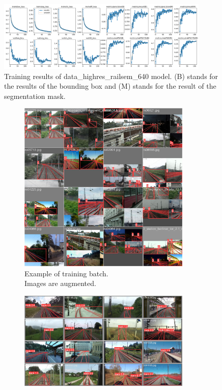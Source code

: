\documentclass[Master,MDS,english]{BASE/twbook} %
\begin{document}
\begin{figure}[h]
\centering
\includegraphics[width=0.9\textwidth]{images/yolo/highres/results}
\caption{Training results of data\_highres\_railsem\_640 model. (B) stands for the results of the bounding box and (M) stands for the result of the segmentation mask.}
\label{fig:training_highres}
\end{figure}

\begin{figure}
\centering
\begin{subfigure}{.5\textwidth}
  \centering
  \includegraphics[width=0.9\textwidth]{images/yolo/highres/train_batch0}
  \caption{Example of training batch.\\ Images are augmented.}
  \label{fig:mosaic_augmentation}
\end{subfigure}%
\begin{subfigure}{.5\textwidth}
  \centering
  \includegraphics[width=0.9\textwidth]{images/yolo/highres/val_batch1_pred}

\end{subfigure}
\end{figure}
\end{document}
